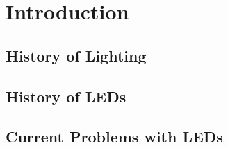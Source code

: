 \section{Introduction}\label{introduction}

\subsection{History of Lighting}\label{history-of-lighting}

\subsection{History of LEDs}\label{history-of-leds}

\subsection{Current Problems with
LEDs}\label{current-problems-with-leds}
